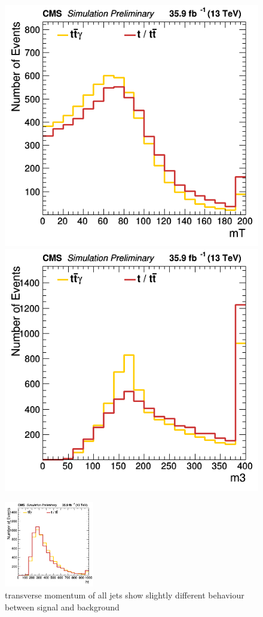 \documentclass[11pt]{scrartcl}
\begin{document}
	\begin{figure}[H]
	\centering
	\begin{minipage}{.5\textwidth}
	  \centering
	  \includegraphics[width=0.70\linewidth]{figures/Select1/mT.png}
	\end{minipage}%
	\begin{minipage}{.5\textwidth}
	  \centering
	  \includegraphics[width=0.70\linewidth]{figures/Select1/m3.png}
	\end{minipage}
	\end{figure}

	\begin{figure}[H]
	\centering
	\includegraphics[width=0.35\textwidth]{figures/Select1/ht.png}
	\caption{transverse momentum of all jets show slightly different behaviour between signal and background}
 	\label{fig:ht}
	\end{figure}
	
\end{document}
